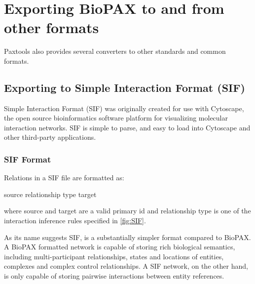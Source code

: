 \documentclass{tufte-book}
\begin{document}
\chapter{Exporting BioPAX to and from other formats}

Paxtools also provides several converters to other standards and common formats. 

\section{Exporting to Simple Interaction Format (SIF)}
Simple Interaction Format (SIF) was originally created for use with Cytoscape, the open source bioinformatics software platform for visualizing molecular interaction networks. SIF is simple to parse, and easy to load into Cytoscape and other third-party applications. 
\subsection{SIF Format}

Relations in a SIF file are formatted as: 

\begin{xmlcode}
source relationship type target
\end{xmlcode}

where source and target are a valid primary id and relationship type is one of the interaction inference rules specified in \ref{fig:SIF}. 

As its name suggests SIF, is a substantially simpler format compared to BioPAX. A BioPAX formatted network is capable of storing rich biological semantics, including multi-participant relationships, states and locations of entities, complexes and complex control relationships. A SIF network, on the other hand, is only capable of storing pairwise interactions between entity references. 
\end{document}
